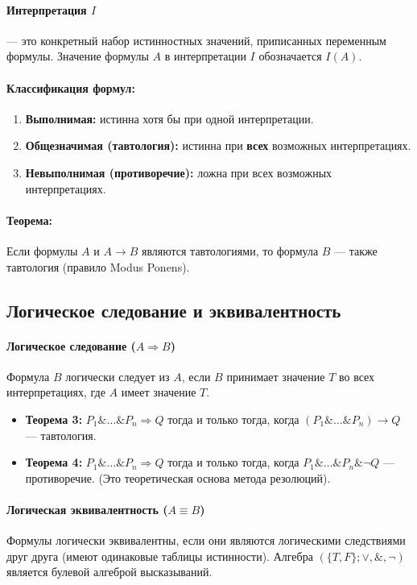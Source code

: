 \paragraph{Интерпретация $I$} — это конкретный набор истинностных значений, приписанных переменным формулы. Значение формулы $A$ в интерпретации $I$ обозначается $I(A)$.

\paragraph{Классификация формул:}
\begin{enumerate}
    \item \textbf{Выполнимая:} истинна хотя бы при одной интерпретации.
    \item \textbf{Общезначимая (тавтология):} истинна при \textbf{всех} возможных интерпретациях.
    \item \textbf{Невыполнимая (противоречие):} ложна при всех возможных интерпретациях.
\end{enumerate}

\paragraph{Теорема:} Если формулы $A$ и $A \to B$ являются тавтологиями, то формула $B$ — также тавтология (правило Modus Ponens).

\subsection*{Логическое следование и эквивалентность}

\paragraph{Логическое следование ($A \Rightarrow B$)}
Формула $B$ логически следует из $A$, если $B$ принимает значение $T$ во всех интерпретациях, где $A$ имеет значение $T$.
\begin{itemize}
    \item \textbf{Теорема 3:} $P_1 \& \dots \& P_n \Rightarrow Q$ тогда и только тогда, когда $(P_1 \& \dots \& P_n) \to Q$ — тавтология.
    \item \textbf{Теорема 4:} $P_1 \& \dots \& P_n \Rightarrow Q$ тогда и только тогда, когда $P_1 \& \dots \& P_n \& \neg Q$ — противоречие. (Это теоретическая основа метода резолюций).
\end{itemize}

\paragraph{Логическая эквивалентность ($A \equiv B$)}
Формулы логически эквивалентны, если они являются логическими следствиями друг друга (имеют одинаковые таблицы истинности). Алгебра $(\{T, F\}; \lor, \&, \neg)$ является булевой алгеброй высказываний.

